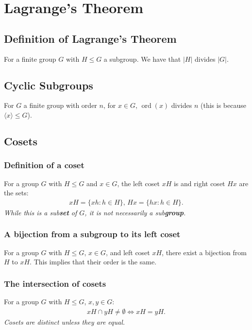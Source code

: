 \documentclass[a4paper, 12pt, twoside]{article}
\DeclareMathOperator{\Ord}{ord}
\begin{document}
\section{Lagrange's Theorem}

\subsection{Definition of Lagrange's Theorem}

For a finite group $G$ with $H \leq G$ a subgroup. We have that 
$|H|$ divides $|G|$.

\subsection{Cyclic Subgroups}

For $G$ a finite group with order $n$, for $x \in G$, $\Ord(x)$ divides
$n$ (this is because $\langle x \rangle \leq G$).

\subsection{Cosets}

\subsubsection{Definition of a coset}

For a group $G$ with $H \leq G$ and $x \in G$, the left coset $xH$ is
and right coset $Hx$ are the sets:
\begin{align*}
      xH = \{xh : h \in H\}, \, Hx = \{hx : h \in H\}.
\end{align*}
\textit{While this is a sub\textbf{set} of $G$, it is not necessarily
a sub\textbf{group}.}

\subsubsection{A bijection from a subgroup to its left coset}

For a group $G$ with $H \leq G$, $x \in G$, and left coset $xH$,
there exist a bijection from $H$ to $xH$. This implies that their
order is the same.

\subsubsection{The intersection of cosets}

For a group $G$ with $H \leq G$, $x, y \in G$:
\begin{align*}
      xH \cap yH \neq \emptyset \Leftrightarrow xH = yH.
\end{align*}
\textit{Cosets are distinct unless they are equal.}
 
\end{document}
